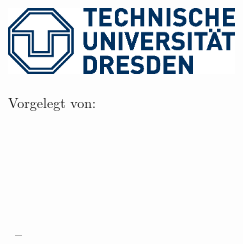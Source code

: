 
\begin{titlepage}

\begin{addmargin}[-1cm]{-3cm}
\begin{center}
\large

\hfill
\vfill

\begingroup
\color{Maroon}\spacedallcaps{\myTitle} \\ \bigskip %
\endgroup
\spacedlowsmallcaps{\mySubtitle} \\ \medskip %


\vfill

%
{
\includegraphics[width=6cm]{figures/tud_logo.eps}
}
\\ \medskip %

Vorgelegt von: \\
\myName \\ %
\myDegree \\
\myDepartment \\
\myFaculty \\
\myUni \\ \bigskip

\myTime\ -- \myVersion %

\vfill

\end{center}
\end{addmargin}

\end{titlepage}